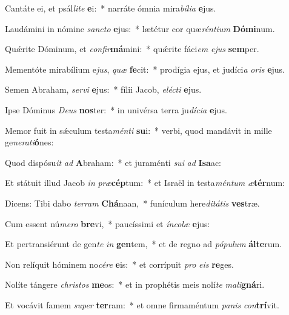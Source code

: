 \item Cantáte ei, et psál\textit{li}\textit{te} \textbf{e}i:~* narráte ómnia mira\textit{bí}\textit{li}\textit{a} \textbf{e}jus.
\item Laudámini in nómine \textit{sanc}\textit{to} \textbf{e}jus:~* lætétur cor quæ\textit{rén}\textit{ti}\textit{um} \textbf{Dó}\textbf{mi}num.
\item Quǽrite Dóminum, et \textit{con}\textit{fir}\textbf{má}mini:~* quǽrite fáci\textit{em} \textit{e}\textit{jus} \textbf{sem}per.
\item Mementóte mirabílium e\textit{jus}, \textit{quæ} \textbf{fe}cit:~* prodígia ejus, et judíci\textit{a} \textit{o}\textit{ris} \textbf{e}jus.
\item Semen Abraham, \textit{ser}\textit{vi} \textbf{e}jus:~* fílii Jacob, \textit{e}\textit{léc}\textit{ti} \textbf{e}jus.
\item Ipse Dóminus \textit{De}\textit{us} \textbf{nos}ter:~* in univérsa terra ju\textit{dí}\textit{ci}\textit{a} \textbf{e}jus.
\item Memor fuit in sǽculum testa\textit{mén}\textit{ti} \textbf{su}i:~* verbi, quod mandávit in mille ge\textit{ne}\textit{ra}\textit{ti}\textbf{ó}nes:
\item Quod dispósu\textit{it} \textit{ad} \textbf{A}braham:~* et juraménti \textit{su}\textit{i} \textit{ad} \textbf{I}\textbf{sa}ac:
\item Et státuit illud Jacob \textit{in} \textit{præ}\textbf{cép}tum:~* et Israël in testa\textit{mén}\textit{tum} \textit{æ}\textbf{tér}num:
\item Dicens: Tibi dabo \textit{ter}\textit{ram} \textbf{Chá}naan,~* funículum here\textit{di}\textit{tá}\textit{tis} \textbf{ves}træ.
\item Cum essent nú\textit{me}\textit{ro} \textbf{bre}vi,~* paucíssimi et \textit{ín}\textit{co}\textit{læ} \textbf{e}jus:
\item Et pertransiérunt de gen\textit{te} \textit{in} \textbf{gen}tem,~* et de regno ad \textit{pó}\textit{pu}\textit{lum} \textbf{ál}\textbf{te}rum.
\item Non relíquit hóminem no\textit{cé}\textit{re} \textbf{e}is:~* et corrípuit \textit{pro} \textit{e}\textit{is} \textbf{re}ges.
\item Nolíte tángere \textit{chris}\textit{tos} \textbf{me}os:~* et in prophétis meis nolí\textit{te} \textit{ma}\textit{li}\textbf{gná}ri.
\item Et vocávit famem \textit{su}\textit{per} \textbf{ter}ram:~* et omne firmaméntum \textit{pa}\textit{nis} \textit{con}\textbf{trí}vit.

